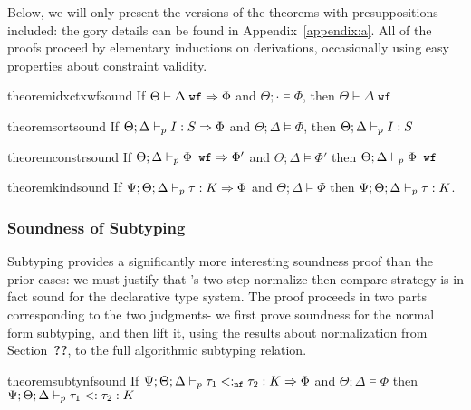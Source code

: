 Below, we will only present the versions of the theorems with presuppositions included: the gory details can be found in Appendix~\ref{appendix:a}. All of the proofs proceed by elementary inductions on derivations, occasionally using easy properties about constraint validity.

\begin{restatable}{theorem}{idxctxwfsound}
If $\Theta \vdash \Delta \; \texttt{wf} \Rightarrow \Phi$ and $\Theta ; \cdot \vDash \Phi$, then $\Theta \vdash \Delta \; \texttt{wf}$
\label{thm:idx-ctx-wf-sound}
\end{restatable}

\begin{restatable}{theorem}{sortsound}
If $\Theta;\Delta \vdash_p I : S \Rightarrow \Phi$ and $\Theta;\Delta \vDash \Phi$, then $\Theta;\Delta \vdash_p I : S$ 
\label{thm:sort-sound}
\end{restatable}

\begin{restatable}{theorem}{constrsound}
If $\Theta ; \Delta \vdash_p \Phi \texttt{ wf} \Rightarrow \Phi'$ and $\Theta ; \Delta \vDash \Phi'$ then $\Theta ; \Delta \vdash_p \Phi \texttt{ wf}$
\label{thm:constr-sound}
\end{restatable}

\begin{restatable}{theorem}{kindsound}
If $\Psi ; \Theta ; \Delta \vdash_p \tau : K \Rightarrow \Phi$ and $\Theta ; \Delta \vDash \Phi$ then $\Psi ; \Theta ; \Delta \vdash_p \tau : K$.
\label{thm:kind-sound}
\end{restatable}

\subsubsection{Soundness of Subtyping}
Subtyping provides a significantly more interesting soundness proof than the prior cases: we must justify that \bilambdaamor's two-step normalize-then-compare strategy is in fact sound for the declarative type system. The proof proceeds in two parts corresponding to the two judgments- we first prove soundness for the normal form subtyping, and then lift it, using the results about normalization from Section~\textbf{??}, to the full algorithmic subtyping relation.

\begin{restatable}{theorem}{subtynfsound}
If $\Psi ; \Theta ; \Delta \vdash_p \tau_1 <:_{\texttt{nf}} \tau_2 : K \Rightarrow \Phi$ and $\Theta ; \Delta \vDash \Phi$ then $\Psi ; \Theta ; \Delta \vdash_p \tau_1 <: \tau_2 : K$
\label{thm:subtynf-sound}
\end{restatable}


